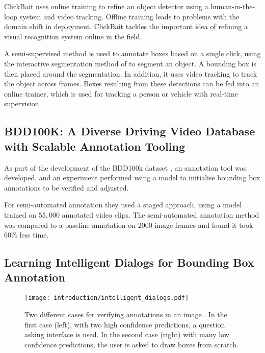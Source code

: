 ClickBait uses online training to refine an object detector using a human-in-the-loop system and video tracking. Offline training leads to problems with the domain shift in deployment. ClickBait tackles the important idea of refining a visual recognition system online in the field.

A semi-supervised method is used to annotate boxes based on a single click, using the interactive segmentation method of \cite{Xu2016} to segment an object. A bounding box is then placed around the segmentation. In addition, it uses video tracking to track the object across frames. Boxes resulting from these detections can be fed into an online trainer, which is used for tracking a person or vehicle with real-time supervision.


\subsection{BDD100K: A Diverse Driving Video Database with
Scalable Annotation Tooling \texorpdfstring{\cite{Yu2018a} }{}}

As part of the development of the BDD100k dataset \cite{Yu2018a}, an annotation tool was developed, and an experiment performed using a model to initialise bounding box annotations to be verified and adjusted. 

For semi-automated annotation they used a staged approach, using a model trained on $55,000$ annotated video clips. The semi-automated annotation method was compared to a baseline annotation on 2000 image frames and found it took $60\%$ less time.

\subsection{Learning Intelligent Dialogs for Bounding Box Annotation}

\begin{figure}[h]
  \centering
  \texttt{[image: introduction/intelligent\_dialogs.pdf]}
  \caption{Two different cases for verifying annotations in an image \cite{Konyushkova2017}. In the first case (left), with two high confidence predictions, a question asking interface is used. In the second case (right) with many low confidence predictions, the user is asked to draw boxes from scratch. }
  \label{fig:intelligent_dialogs}
\end{figure}

